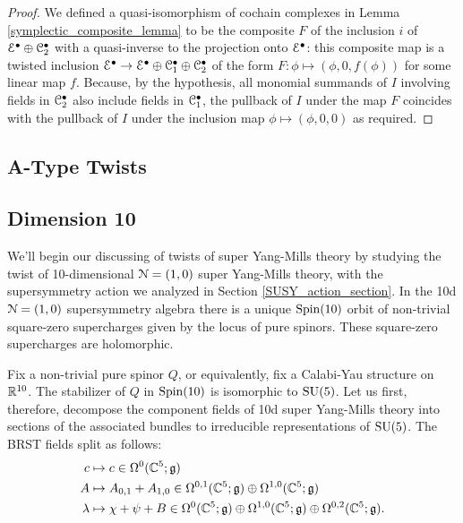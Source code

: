 \documentclass[10pt, oneside]{article}
\begin{document}
\begin{proof}
We defined a quasi-isomorphism of cochain complexes in Lemma \ref{symplectic_composite_lemma} to be the composite $F$ of the inclusion $i$ of $\mathcal{E}^\bullet \oplus \mathcal{C}_2^\bullet$ with a quasi-inverse to the projection onto $\mathcal{E}^\bullet$: this composite map is a twisted inclusion $\mathcal{E}^\bullet \to \mathcal{E}^\bullet \oplus \mathcal{C}_1^\bullet \oplus \mathcal{C}_2^\bullet$ of the form $F \colon \phi \mapsto (\phi, 0, f(\phi))$ for some linear map $f$.  Because, by the hypothesis, all monomial summands of $I$ involving fields in $\mathcal{C}_2^\bullet$ also include fields in $\mathcal{C}_1^\bullet$, the pullback of $I$ under the map $F$ coincides with the pullback of $I$ under the inclusion map $\phi \mapsto (\phi, 0, 0)$ as required.
\end{proof}

\subsection{A-Type Twists} \label{A_twist_section}

\subsection{Dimension 10}
We'll begin our discussing of twists of super Yang-Mills theory by studying the twist of 10-dimensional $\mathcal{N}=(1,0)$ super Yang-Mills theory, with the supersymmetry action we analyzed in Section \ref{SUSY_action_section}.  In the 10d $\mathcal{N}=(1,0)$ supersymmetry algebra there is a unique $\mathrm{Spin}(10)$ orbit of non-trivial square-zero supercharges given by the locus of pure spinors.  These square-zero supercharges are holomorphic.

Fix a non-trivial pure spinor $Q$, or equivalently, fix a Calabi-Yau structure on $\mathbb R^{10}$.  The stabilizer of $Q$ in $\mathrm{Spin}(10)$ is isomorphic to $\mathrm{SU}(5)$.  Let us first, therefore, decompose the component fields of 10d super Yang-Mills theory into sections of the associated bundles to irreducible representations of $\mathrm{SU}(5)$.  The BRST fields split as follows:
\begin{align*}
c &\mapsto c \in \Omega^0(\mathbb C^5; \mathfrak{g}) \\
A &\mapsto A_{0, 1} + A_{1, 0} \in \Omega^{0,1}(\mathbb C^5; \mathfrak{g}) \oplus \Omega^{1,0}(\mathbb C^5; \mathfrak{g})\\
\lambda &\mapsto \chi + \psi + B \in \Omega^0(\mathbb C^5; \mathfrak{g}) \oplus \Omega^{1,0}(\mathbb C^5; \mathfrak{g}) \oplus \Omega^{0,2}(\mathbb C^5; \mathfrak{g}). 
\end{align*}
\end{document}
